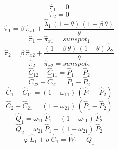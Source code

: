 \begin{dmath}
{{\hat{\pi}_{1}}}=0
\end{dmath}
\begin{dmath}
{{\hat{\pi}_{2}}}=0
\end{dmath}
\begin{dmath}
{{\hat{\pi}_{1}}}={{\beta}}\, {{\hat{\pi}_{x1}}}+\frac{{{\hat{\lambda}_{1}}}\, \left(1-{{\theta}}\right)\, \left(1-{{\beta}}\, {{\theta}}\right)}{{{\theta}}}
\end{dmath}
\begin{dmath}
{{\hat{\pi}_{1}}}-{{\hat{\pi}_{x1}}}={{sunspot_{1}}}
\end{dmath}
\begin{dmath}
{{\hat{\pi}_{2}}}={{\beta}}\, {{\hat{\pi}_{x2}}}+\frac{\left(1-{{\beta}}\, {{\theta}}\right)\, \left(1-{{\theta}}\right)\, {{\hat{\lambda}_{2}}}}{{{\theta}}}
\end{dmath}
\begin{dmath}
{{\hat{\pi}_{2}}}-{{\hat{\pi}_{x2}}}={{sunspot_{2}}}
\end{dmath}
\begin{dmath}
{{\hat{C}_{12}}}-{{\hat{C}_{11}}}={{\hat{P}_{1}}}-{{\hat{P}_{2}}}
\end{dmath}
\begin{dmath}
{{\hat{C}_{22}}}-{{\hat{C}_{21}}}={{\hat{P}_{1}}}-{{\hat{P}_{2}}}
\end{dmath}
\begin{dmath}
{{\hat{C}_{1}}}-{{\hat{C}_{11}}}=\left(1-{{\omega_{11}}}\right)\, \left({{\hat{P}_{1}}}-{{\hat{P}_{2}}}\right)
\end{dmath}
\begin{dmath}
{{\hat{C}_{2}}}-{{\hat{C}_{21}}}=\left(1-{{\omega_{21}}}\right)\, \left({{\hat{P}_{1}}}-{{\hat{P}_{2}}}\right)
\end{dmath}
\begin{dmath}
{{\hat{Q}_{1}}}={{\omega_{11}}}\, {{\hat{P}_{1}}}+\left(1-{{\omega_{11}}}\right)\, {{\hat{P}_{2}}}
\end{dmath}
\begin{dmath}
{{\hat{Q}_{2}}}={{\omega_{21}}}\, {{\hat{P}_{1}}}+\left(1-{{\omega_{21}}}\right)\, {{\hat{P}_{2}}}
\end{dmath}
\begin{dmath}
{{\varphi}}\, {{\hat{L}_{1}}}+{{\sigma}}\, {{\hat{C}_{1}}}={{\hat{W}_{1}}}-{{\hat{Q}_{1}}}
\end{dmath}
